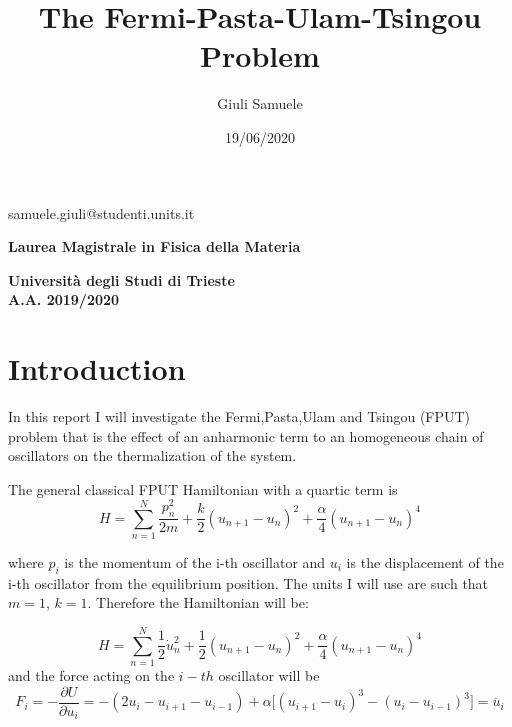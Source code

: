 \documentclass[10pt]{article}
\numberwithin{equation}{section}
\begin{document}

	\title{The Fermi-Pasta-Ulam-Tsingou Problem}
	\date{19/06/2020}
	\author{ Giuli Samuele  }
	\maketitle
	\begin{center}
	samuele.giuli@studenti.units.it 

	\textbf{Laurea Magistrale in Fisica della Materia}
	
	\textbf{ \small{Università degli Studi di Trieste\\ A.A. 2019/2020}}
	\end{center}
	
	\clearpage
    
\section{Introduction}

In this report I will investigate the Fermi,Pasta,Ulam and Tsingou (FPUT) problem that is the effect of an anharmonic term to an homogeneous chain of oscillators on the thermalization of the system. 

The general classical FPUT Hamiltonian with a quartic term is 
\begin{equation}
H = \sum_{n=1}^N \frac{p_n^2}{2m} + \frac{k}{2}(u_{n+1}-u_n)^2 + \frac{\alpha}{4}(u_{n+1}-u_n)^4
\end{equation}

where $p_i$ is the momentum of the i-th oscillator and $u_i$ is the displacement of the i-th oscillator from the equilibrium position. The units I will use are such that $m=1$, $k=1$. Therefore the Hamiltonian will be:

\begin{equation} \label{Ham}
H = \sum_{n=1}^N \frac{1}{2} \dot{u}_n^2 + \frac{1}{2}(u_{n+1}-u_n)^2 + \frac{\alpha}{4}(u_{n+1}-u_n)^4
\end{equation}
and the force acting on the $i-th$ oscillator will be
\begin{equation}
F_i = -\frac{\partial U}{\partial u_i}= -(2u_i - u_{i+1} - u_{i-1}) + \alpha \big[ (u_{i+1}-u_i)^3 -( u_i -u_{i-1})^3   \big] = \ddot{u_i}
\end{equation}
\end{document}
